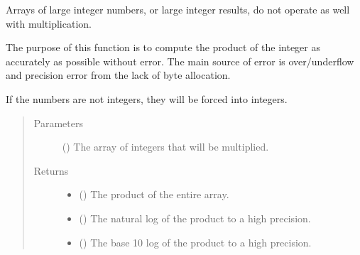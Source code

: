 \documentclass[letterpaper,10pt,english]{sphinxmanual}
\begin{document}

\begin{fulllineitems}
\label{\detokenize{docstrings/ifa_smeargle.core.mathematics:ifa_smeargle.core.mathematics.ifas_large_integer_array_product}}
Arrays of large integer numbers, or large integer results,
do not operate as well with multiplication.

The purpose of this function is to compute the product of the
integer as accurately as possible without error. The main source
of error is over/underflow and precision error from the lack of
byte allocation.

If the numbers are not integers, they will be forced into
integers.
\begin{quote}\begin{description}
\item[{Parameters}] \leavevmode
{} () \textendash{} The array of integers that will be multiplied.

\item[{Returns}] \leavevmode
\begin{itemize}
\item {} 
 () \textendash{} The product of the entire array.

\item {} 
 () \textendash{} The natural log of the product to a high precision.

\item {} 
 () \textendash{} The base 10 log of the product to a high precision.

\end{itemize}


\end{description}\end{quote}

\end{fulllineitems}

\end{document}
